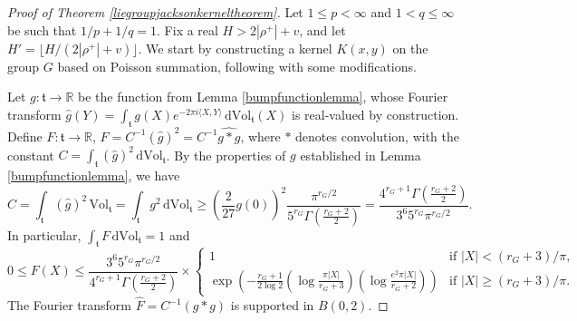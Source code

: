 \documentclass[11pt,a4paper]{article}
\theoremstyle{definition}
\begin{document}
\begin{proof}[Proof of Theorem \ref{liegroupjacksonkerneltheorem}] Let $1 \le p < \infty$ and $1<q \le \infty$ be such that $1/p+1/q=1$. Fix a real $H > 2 |\rho^+|+v$, and let $H'=\lfloor H/(2|\rho^+|+v) \rfloor$. We start by constructing a kernel $K(x,y)$ on the group $G$ based on Poisson summation, following \cite{BOR1,CK} with some modifications.

Let $g: \mathfrak{t} \to \mathbb{R}$ be the function from Lemma \ref{bumpfunctionlemma}, whose Fourier transform $\widehat{g}(Y)=\int_{\mathfrak{t}} g(X) e^{-2\pi i \langle X,Y \rangle} \, \mathrm{d}\mathrm{Vol}_{\mathfrak{t}}(X)$ is real-valued by construction. Define $F: \mathfrak{t} \to \mathbb{R}$, $F=C^{-1} (\widehat{g})^2 = C^{-1} \widehat{g*g}$, where $*$ denotes convolution, with the constant $C=\int_{\mathfrak{t}}(\widehat{g})^2 \, \mathrm{d}\mathrm{Vol}_{\mathfrak{t}}$. By the properties of $g$ established in Lemma \ref{bumpfunctionlemma}, we have
\[ C = \int_{\mathfrak{t}} (\widehat{g})^2 \, \mathrm{Vol}_{\mathfrak{t}} = \int_{\mathfrak{t}} g^2 \, \mathrm{d}\mathrm{Vol}_{\mathfrak{t}} \ge \left( \frac{2}{27} g(0) \right)^2 \frac{\pi^{r_G /2}}{5^{r_G} \Gamma \left( \frac{r_G +2}{2} \right)} = \frac{4^{r_G+1} \Gamma \left( \frac{r_G +2}{2} \right)}{3^6 5^{r_G} \pi^{r_G /2}} . \]
In particular, $\int_{\mathfrak{t}}F \, \mathrm{d} \mathrm{Vol}_{\mathfrak{t}}=1$ and
\begin{equation}\label{FXestimate}
0 \le F(X) \le \frac{3^6 5^{r_G} \pi^{r_G /2}}{4^{r_G +1} \Gamma \left( \frac{r_G +2}{2} \right)} \times \left\{ \begin{array}{ll} 1 & \textrm{if } |X| < (r_G +3)/\pi, \\ \exp \left( - \frac{r_G +1}{2 \log 2} \left( \log \frac{\pi |X|}{r_G +3} \right) \left( \log \frac{e^2 \pi |X|}{r_G +2} \right) \right) & \textrm{if } |X| \ge (r_G +3)/\pi. \end{array} \right.
\end{equation}
The Fourier transform $\widehat{F} = C^{-1} (g*g)$ is supported in $B(0,2)$.


\end{proof}
\end{document}
